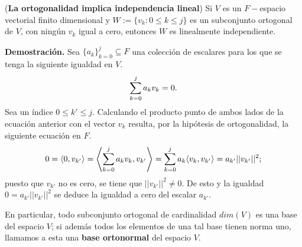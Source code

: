 \begin{prop}
(\textbf{La ortogonalidad implica independencia lineal})
Si $V$ es un $F-$espacio vectorial finito dimensional y 
$W :=\{ v_{k} : 0\leq k \leq j \}$ es un subconjunto ortogonal de
$V$, 
con ningún $v_{k}$ igual a cero, 
entonces $W$ es linealmente independiente.
\end{prop}
\noindent
\textbf{Demostración.}
Sea
$\{a_{k} \}_{k=0}^{j} \subseteq F$
una colección de escalares para los que se
tenga la siguiente igualdad en $V$.
\[
\sum\limits_{k=0}^{j}a_{k}v_{k} = 0.
\]
Sea un índice $0 \leq k' \leq j$.
Calculando el producto punto de ambos lados
de la ecuación anterior con el vector $v_{k}$
resulta, por la hipótesis de ortogonalidad, la
siguiente ecuación en $F$. 
\[
0 = 
\langle
0, v_{k'}
\rangle =
\left\langle
\suma{k=0}{j}{a_{k}v_{k}}
, v_{k'}
\right\rangle
= 
\suma{k=0}{j}{
a_{k}
\langle
v_{k}
, v_{k'}
\rangle
}
= 
a_{k'} ||v_{k'} ||^{2};
\]
\noindent
puesto que $v_{k'}$ no es cero,
se tiene que 
$||v_{k'} ||^{2} \neq 0$. De esto y la igualdad 
$0 = a_{k'} ||v_{k'} ||^{2}$ se deduce la igualdad
a cero del escalar $a_{k'}$.
\QEDB
\vspace{0.2cm}

En particular, todo subconjunto ortogonal de cardinalidad
$dim(V)$ es una base del espacio $V$; si además todos los elementos
de una tal base tienen norma uno, llamamos a esta una
\textbf{base ortonormal} del espacio $V$. 


